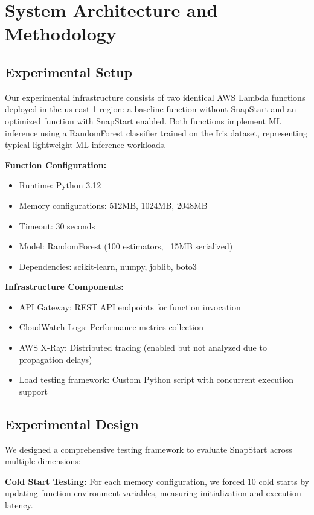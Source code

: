 \documentclass[conference]{IEEEtran}
\begin{document}
\section{System Architecture and Methodology}

\subsection{Experimental Setup}
Our experimental infrastructure consists of two identical AWS Lambda functions deployed in the us-east-1 region: a baseline function without SnapStart and an optimized function with SnapStart enabled. Both functions implement ML inference using a RandomForest classifier trained on the Iris dataset, representing typical lightweight ML inference workloads.

\textbf{Function Configuration:}
\begin{itemize}
\item Runtime: Python 3.12
\item Memory configurations: 512MB, 1024MB, 2048MB
\item Timeout: 30 seconds
\item Model: RandomForest (100 estimators, ~15MB serialized)
\item Dependencies: scikit-learn, numpy, joblib, boto3
\end{itemize}

\textbf{Infrastructure Components:}
\begin{itemize}
\item API Gateway: REST API endpoints for function invocation
\item CloudWatch Logs: Performance metrics collection
\item AWS X-Ray: Distributed tracing (enabled but not analyzed due to propagation delays)
\item Load testing framework: Custom Python script with concurrent execution support
\end{itemize}

\subsection{Experimental Design}
We designed a comprehensive testing framework to evaluate SnapStart across multiple dimensions:

\textbf{Cold Start Testing:} For each memory configuration, we forced 10 cold starts by updating function environment variables, measuring initialization and execution latency.
\end{document}

